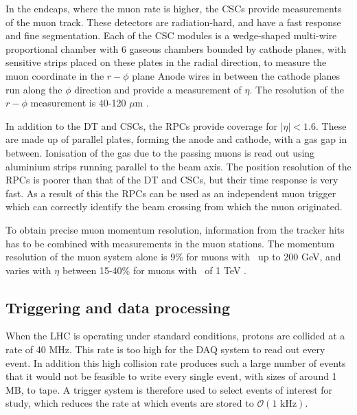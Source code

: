In the endcaps, where the muon rate is higher, the \ac{CSCs} provide
measurements of the muon track. These detectors are radiation-hard,
and have a fast response and fine segmentation.
Each of the CSC modules is a wedge-shaped
multi-wire proportional chamber %
with 6 gaseous chambers bounded by cathode planes, with
sensitive strips placed on these plates in the
radial direction, to measure the muon coordinate in the  $r-\phi$ plane
Anode wires in between the cathode planes
run along the $\phi$ direction and provide a measurement of
$\eta$. The resolution of the $r-\phi$ measurement is 40-120 $\mu$m \cite{cms-muon-7tev}.

In addition to the \ac{DT} and \ac{CSCs}, the \ac{RPCs} provide coverage
for $|\eta|<1.6$. These are made up of parallel plates, forming the anode and cathode,
with a gas gap in between. Ionisation of the gas due to the passing
muons is read out using aluminium strips running parallel to the 
beam axis. The position resolution of the \ac{RPCs} is poorer than
that of the \ac{DT} and \ac{CSCs}, but their time response is very fast. As
a result of this the \ac{RPCs} can be used as an independent muon trigger
which can correctly identify the beam crossing from which the muon
originated.

To obtain precise muon momentum resolution, information from 
the tracker hits has to be combined with measurements in the
muon stations. The momentum resolution of the muon system
alone is 9\% for muons with \pT~up to 200 GeV, and varies with $\eta$ 
between 15-40\% for muons with \pT~of 1 TeV \cite{cms-jinst}.



\subsection{Triggering and data processing}
\label{sec:CMSLHC_CMS_trigger}
When the \ac{LHC} is operating under standard conditions, protons are collided at a rate
of 40 MHz. This rate is too high for the \ac{DAQ} system to read out every event. In
addition this high collision rate produces such a large number of events that it would
not be feasible to write every single event, with sizes of around 1 MB, to tape. A trigger
system is therefore used to select events of interest for study, which reduces the rate
at which events are stored to  $\mathcal{O}(1 \text{ kHz})$.

